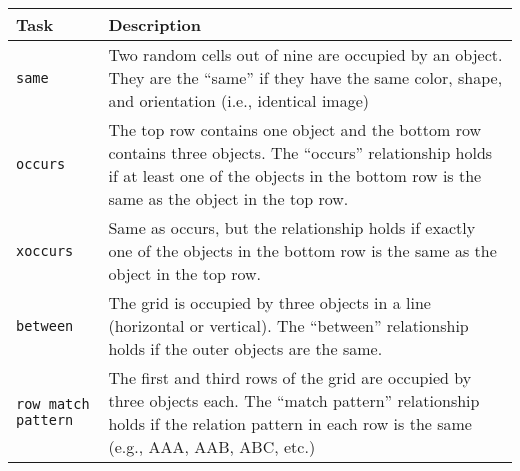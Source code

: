 \begin{tabular}{p{}p{}}
    \toprule
    Task              & Description                                                                                                                                                                                             \\ \midrule
    \texttt{same}              & Two random cells out of nine are occupied by an object. They are the ``same'' if they have the same color, shape, and orientation (i.e., identical image)                                               \\\hline
    \texttt{occurs}            & The top row contains one object and the bottom row contains three objects. The ``occurs'' relationship holds if at least one of the objects in the bottom row is the same as the object in the top row. \\\hline
    \texttt{xoccurs}           & Same as occurs, but the relationship holds if exactly one of the objects in the bottom row is the same as the object in the top row.                                                                    \\\hline
    \texttt{between}           & The grid is occupied by three objects in a line (horizontal or vertical). The ``between'' relationship holds if the outer objects are the same.                                                         \\\hline
    \texttt{row match pattern} & The first and third rows of the grid are occupied by three objects each. The ``match pattern'' relationship holds if the relation pattern in each row is the same (e.g., AAA, AAB, ABC, etc.)           \\ \bottomrule
\end{tabular}